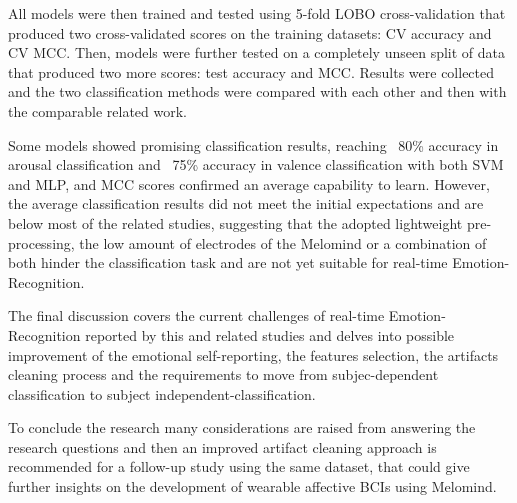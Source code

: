 All models were then trained and tested using 5-fold LOBO cross-validation that produced two cross-validated scores on the training datasets: CV accuracy and CV MCC. Then, models were further tested on a completely unseen split of data that produced two more scores: test accuracy and MCC. Results were collected and the two classification methods were compared with each other and then with the comparable related work. 

Some models showed promising classification results, reaching ~80\% accuracy in arousal classification and ~75\% accuracy in valence classification with both SVM and MLP, and MCC scores confirmed an average capability to learn. However, the average classification results did not meet the initial expectations and are below  most of the related studies, suggesting that the adopted lightweight pre-processing, the low amount of electrodes of the Melomind or a combination of both hinder the classification task and are not yet suitable for real-time Emotion-Recognition.

The final discussion covers the current challenges of real-time Emotion-Recognition reported by this and related studies and delves into possible improvement of the emotional self-reporting, the features selection, the artifacts cleaning process and the requirements to move from subjec-dependent classification to subject independent-classification.

To conclude the research  many considerations are raised from answering the research questions and then an improved artifact cleaning approach is recommended for a follow-up study using the same dataset, that could give further insights on the development of wearable affective BCIs using Melomind.
